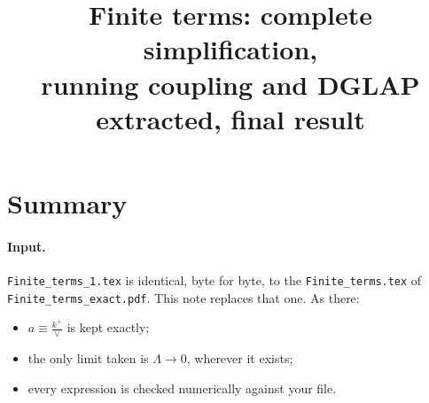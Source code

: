 \documentclass[10pt]{article}
\title{Finite terms: complete simplification,\\ running coupling and DGLAP extracted, final result}
\date{}
\numberwithin{equation}{section}
\begin{document}
\maketitle
\tableofcontents

\section{Summary}\label{sec:summary}
\paragraph{Input.} \texttt{Finite\_terms\_1.tex} is identical, byte for byte, to the \texttt{Finite\_terms.tex} of \texttt{Finite\_terms\_exact.pdf}. This note replaces that one. As there:
\begin{itemize}
\item $a\equiv\frac{k^+}{\vee}$ is kept exactly;
\item the only limit taken is $\Lambda\to0$, wherever it exists;
\item every expression is checked numerically against your file.
\end{itemize}
\end{document}
